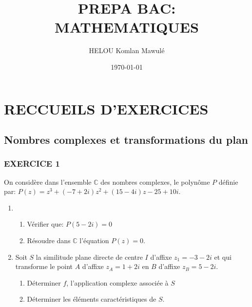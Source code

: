 \documentclass[13pts]{report}
\author{HELOU Komlan Mawulé}
\date{\today}
\title{PREPA BAC: MATHEMATIQUES}
\begin{document}
	\maketitle
	\tableofcontents
	\part{RECCUEILS D'EXERCICES}
	\chapter{Nombres complexes et transformations du plan}
	\section*{EXERCICE 1}
		On considère dans l'ensemble $\mathbb{C}$ des nombres complexes, le polynôme $P$ définie par: $P(z)=z^3+(-7+2i)z^2+(15-4i)z-25+10i$.
		\begin{enumerate}
			\item 
				\begin{enumerate}
					\item Vérifier que: $P(5-2i)=0$
					\item Résoudre dans $\mathbb{C}$ l'équation $P(z)=0$.
				\end{enumerate}
			\item \begin{enumerate}
					Soit $S$ la similitude plane directe de centre $I$ d'affixe $z_1=-3-2i$ et qui transforme le point $A$ d'affixe $z_A=1+2i$ en $B$ d'affixe $z_B=5-2i$.
					\begin{enumerate}
						\item Déterminer $f$, l'application complexe associée à $S$
						\item Déterminer les éléments caractéristiques de $S$.
					\end{enumerate}
				\end{enumerate}
		\end{enumerate}
	
\end{document}
